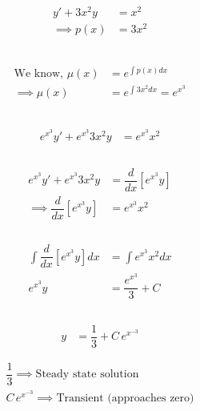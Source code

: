 \documentclass{article}
\begin{document}
\begin{align*}
y'+3x^2y&=x^2\\
\implies p(x)&=3x^2\\\\
\end{align*}
\\
\begin{align*}
\text{We know, }\mu(x)&=e^{\int p(x)dx}\\
\implies\mu(x)&=e^{\int3x^2dx}=e^{x^3}\\\\
\end{align*}
\\
\begin{align*}
e^{x^3}y'+e^{x^3}3x^2y&=e^{x^3}x^2\\
\end{align*}
\\
\begin{align*}
e^{x^3}y'+e^{x^3}3x^2y&=\dfrac{d}{dx}[e^{x^3}y]\\
\implies\dfrac{d}{dx}[e^{x^3}y]&=e^{x^3}x^2\\
\end{align*}
\\
\begin{align*}
\int\dfrac{d}{dx}[e^{x^3}y]dx&=\int e^{x^3}x^2dx\\
e^{x^3}y&=\dfrac{e^{x^3}}{3}+C\\
\end{align*}
\\
\begin{align*}
y&=\dfrac{1}{3}+C\,e^{x^{-3}}\\\\
\end{align*}
\begin{align*}
\dfrac{1}{3}\implies \text{Steady state solution}\\
C\,e^{x^{-3}}\implies \text{Transient (approaches zero)}
\end{align*}
\end{document}

